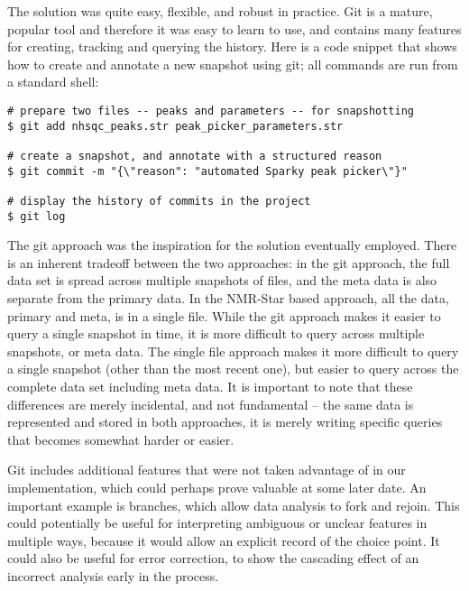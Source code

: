 The solution was quite easy, flexible, and robust in practice.  Git is a mature,
popular tool and therefore it was easy to learn to use, and contains many
features for creating, tracking and querying the history.  Here is a code 
snippet that shows how to create and annotate a new snapshot using git; all
commands are run from a standard shell:
\begin{verbatim}
# prepare two files -- peaks and parameters -- for snapshotting
$ git add nhsqc_peaks.str peak_picker_parameters.str

# create a snapshot, and annotate with a structured reason
$ git commit -m "{\"reason": "automated Sparky peak picker\"}"

# display the history of commits in the project
$ git log
\end{verbatim}

The git approach was the inspiration for the solution eventually employed.
There is an inherent tradeoff between the two approaches: in the git approach,
the full data set is spread across multiple snapshots of files, and the meta
data is also separate from the primary data.  In the NMR-Star based approach,
all the data, primary and meta, is in a single file.  While the git approach
makes it easier to query a single snapshot in time, it is more difficult to
query across multiple snapshots, or meta data.  The single file approach makes
it more difficult to query a single snapshot (other than the most recent one),
but easier to query across the complete data set including meta data.  It is
important to note that these differences are merely incidental, and not 
fundamental -- the same data is represented and stored in both approaches, it
is merely writing specific queries that becomes somewhat harder or easier.

Git includes additional features that were not taken advantage of in our
implementation, which could perhaps prove valuable at some later date.  An
important example is branches, which allow data analysis to fork and rejoin.
This could potentially be useful for interpreting ambiguous or unclear features
in multiple ways, because it would allow an explicit record of the choice point.
It could also be useful for error correction, to show the cascading effect of
an incorrect analysis early in the process.


